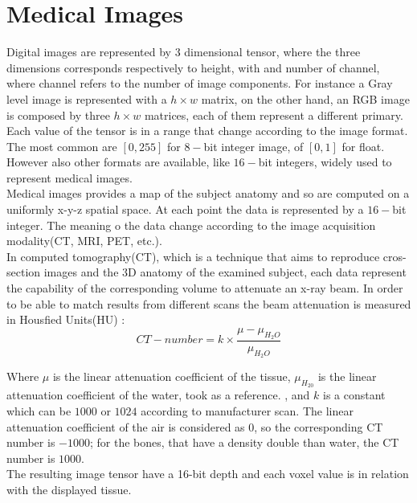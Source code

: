 \documentclass{standalone}
\begin{document}
	\section{Medical Images}
	
	Digital images are represented by 3 dimensional tensor, where the three dimensions corresponds respectively to height, with and number of channel, where channel refers to the number of image components. For instance a Gray level image is represented with a $h\times w$ matrix, on the other hand, an RGB image is composed by three $h\times w$ matrices, each of them represent a different primary. 
	Each value of the tensor is in a range that change according to the image format. The most common are $[0, 255]$ for $8-$bit integer image, of $[0, 1]$ for float. However also other formats are available, like $16-$bit integers, widely used to represent medical images.\\

	Medical images provides a map of the subject anatomy and so are computed on a uniformly x-y-z spatial space. At each point the data is represented by a $16-$bit integer. The meaning o the data change according to the image acquisition modality(CT, MRI, PET, etc.).\\
	In computed tomography(CT), which is a technique that aims to reproduce cros-section images and the 3D anatomy of the examined subject, each data represent the capability  of the corresponding volume to attenuate an x-ray beam. In order to be able to match results from different scans the beam attenuation is measured in Housfied Units(HU) : 
	\begin{equation}\label{eq:HU}
		CT-number = k\times\frac{\mu - \mu_{H_2O}}{\mu_{H_2O}}
	\end{equation}
	
	Where $\mu$ is the linear attenuation coefficient of the tissue, $\mu_{H_20}$ is the linear attenuation coefficient of the water, took as a reference. , and $k$ is a constant which can be $1000$ or $1024$ according to manufacturer scan. The linear attenuation coefficient of the air is considered as $0$, so the corresponding CT number is $-1000$; for the bones, that have a density double than water, the CT number is $1000$. \\
	The resulting image tensor have a 16-bit depth and each voxel value is in relation with the displayed tissue.\\
		
\end{document}
